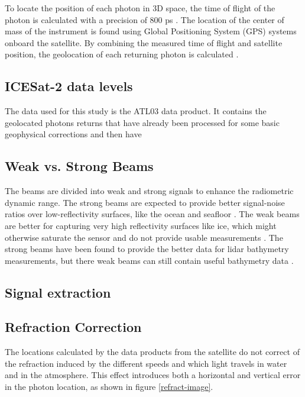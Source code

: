 To locate the position of each photon in 3D space, the time of flight of the photon is calculated with a precision of 800 ps \parencite{Neumann2019d}. The location of the center of mass of the instrument is found using Global Positioning System (GPS) systems onboard the satellite. By combining the measured time of flight and satellite position, the geolocation of each returning photon is calculated \parencite{Neumann2019d}.


\subsection{ICESat-2 data levels}
The data used for this study is the ATL03 data product. It contains the geolocated photons returns that have already been processed for some basic geophysical corrections and then have
\subsection{Weak vs. Strong Beams}

The beams are divided into weak and strong signals to enhance the radiometric dynamic range. The strong beams are expected to provide better signal-noise ratios over low-reflectivity surfaces, like the ocean and seafloor \parencite{Neumann2019d}. The weak beams are better for capturing very high reflectivity surfaces like ice, which might otherwise saturate the sensor and do not provide usable measurements \parencite{}. The strong beams have been found to provide the better data for lidar bathymetry measurements, but there weak beams can still contain useful bathymetry data \parencite{add citation}.

\subsection{Signal extraction}

\subsection{Refraction Correction}
The locations calculated by the data products from the satellite do not correct of the refraction induced by the different speeds and which light travels in water and in the atmosphere. This effect introduces both a horizontal and vertical error in the photon location, as shown in figure \ref{refract-image}.

